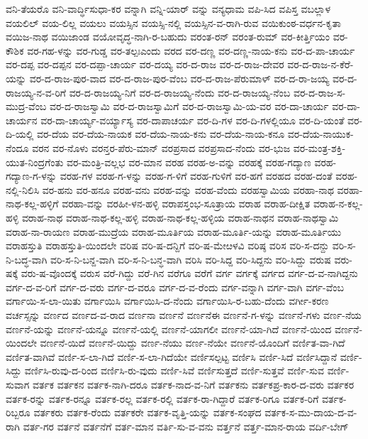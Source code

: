 ವನಿ-ತೆಯರೊ
ವನಿ-ವಾರ್ದ್ಧಿಸುಧಾ-ಕರ
ವನ್ನಾಗಿ
ವನ್ನಿ-ಯಾರ್
ವನ್ನು
ವನ್ಯಧಾಮ
ವಪಿ-ಸಿದ
ವಪಿಸ್ತ
ವಬಲ್ಲಾಳ
ವಯಲಿಲ್
ವಯ-ಲಿಲ್ಲ
ವಯಲು
ವಯಸ್ಸಿನ
ವಯಸ್ಸಿ-ನಲ್ಲಿ
ವಯಸ್ಸಿನ-ವ-ರಾಗಿ-ರುವ
ವಯಿಕುಂಠ-ವರ್ಧನ-ಕೃತಾ
ವಯಿಜ-ನಾಥ
ವಯಿಜಾಂಡ
ವಯೋವೃದ್ಧ-ನಾಗಿ-ರ-ಬಹುದು
ವರಂತ-ರನ್
ವರಂತ-ರುಮ್
ವರ-ಕೀರ್ತ್ತಿಯಂ
ವರ-ಕೌಶಿಕ
ವರ-ಗಹ-ಳನ್ನು
ವರ-ಗುಡ್ಡ
ವರ-ತಲ್ಪಃಎಂದು
ವರದ
ವರ-ದಣ್ಣ
ವರ-ದಣ್ಣ-ನಾಯ-ಕನು
ವರ-ದ-ಪಾ-ಚಾರ್ಯ
ವರ-ದಪ್ಪ
ವರ-ದಪ್ಪನ
ವರ-ದಪ್ಪಾ-ಚಾರ್ಯ
ವರ-ದಯ್ಯ
ವರ-ದ-ರಾಜ
ವರ-ದ-ರಾಜ-ದೇವರ
ವರ-ದ-ರಾಜ-ನ-ಕೆರೆ-ಯನ್ನು
ವರ-ದ-ರಾಜ-ಪುರ-ವಾದ
ವರ-ದ-ರಾಜ-ಪುರ-ವೆಂಬ
ವರ-ದ-ರಾಜ-ಪೆರುಮಾಳ್
ವರ-ದ-ರಾ-ಜಯ್ಯ
ವರ-ದ-ರಾಜಯ್ಯ-ನ-ವ-ರಿಗೆ
ವರ-ದ-ರಾಜಯ್ಯ-ನಿಗೆ
ವರ-ದ-ರಾಜಯ್ಯ-ನೆಂದು
ವರ-ದ-ರಾಜಯ್ಯ-ನೆಂಬ
ವರ-ದ-ರಾಜ-ಸ-ಮುದ್ರ-ವೆಂಬ
ವರ-ದ-ರಾಜಸ್ವಾಮಿ
ವರ-ದ-ರಾಜಸ್ವಾಮಿಗೆ
ವರ-ದ-ರಾಜಸ್ವಾಮಿ-ಯ-ವರ
ವರ-ದಾ-ಚಾರ್ಯ
ವರ-ದಾ-ಚಾರ್ಯನ
ವರ-ದಾ-ಚಾರ್ಯ್ಯ-ವರ್ಯ್ಯಾಸ್ಯ
ವರ-ದಾಪಾಚರ್ಯ
ವರ-ದಿ-ಗಳ
ವರ-ದಿ-ಗಳಲ್ಲಿಯೂ
ವರ-ದಿ-ಯಂತೆ
ವರ-ದಿ-ಯಲ್ಲಿ
ವರ-ದೆಯ
ವರ-ದೆಯ-ನಾಯಕ
ವರ-ದೆಯ-ನಾಯ-ಕನು
ವರ-ದೆಯ-ನಾಯ-ಕನೂ
ವರ-ದೆಯ-ನಾಯುಕ-ನೆಂದೂ
ವರನ
ವರ-ನೊಳು
ವರನ್ತರ-ಪೆರು-ಮಾನ್
ವರಪ್ರಸಾದ
ವರಪ್ರಸಾದ-ನೆಂದು
ವರ-ಭುಜ
ವರ-ಮಂತ್ರ-ಶಕ್ತಿ-ಯುತ-ನಿಂದ್ರಗೆಂತು
ವರ-ಮಂತ್ರಿ-ವಲ್ಲಭ
ವರ-ಮಾನ
ವರಹ
ವರಹ-ಅ-ವನ್ನು
ವರಹಕ್ಕೆ
ವರಹ-ಗದ್ಯಾಣ
ವರಹ-ಗದ್ಯಾಣ-ಗ-ಳನ್ನು
ವರಹ-ಗಳ
ವರಹ-ಗ-ಳನ್ನು
ವರಹ-ಗ-ಳಿಗೆ
ವರಹ-ಗುಳಿಗೆ
ವರ-ಹಗೆ
ವರಹದ
ವರಹ-ದಂತೆ
ವರಹ-ನಲ್ಲಿ-ನಿಲಿಸಿ
ವರ-ಹನು
ವರ-ಹನೂ
ವರಹ-ವನು
ವರಹ-ವನ್ನು
ವರಹ-ವೆಂದು
ವರಹಸ್ವಾಮಿಯ
ವರಹಾ-ನಾಥ
ವರಹಾ-ನಾಥ-ಕಲ್ಲ-ಹಳ್ಳಿಗೆ
ವರಹಾ-ವನ್ನು
ವರಹೀ-ಳನ-ಹಳ್ಳಿ
ವರಾಪಸ್ತಂಭ-ಸೂತ್ರಾಯ
ವರಾಹ
ವರಾಹ-ದೀಕ್ಷಿತ
ವರಾಹ-ನ-ಕಲ್ಲ-ಹಳ್ಳಿ
ವರಾಹ-ನಾಥ
ವರಾಹ-ನಾಥ-ಕಲ್ಲ-ಹಳ್ಳಿ
ವರಾಹ-ನಾಥ-ಕಲ್ಲ-ಹಳ್ಳಿಯ
ವರಾಹ-ನಾಥನ
ವರಾಹ-ನಾಥಸ್ವಾಮಿ
ವರಾಹ-ನಾ-ರಾಯಣ
ವರಾಹ-ಮುದ್ರೆಯ
ವರಾಹ-ಮೂರ್ತಿಯ
ವರಾಹ-ಮೂರ್ತಿ-ಯನ್ನು
ವರಾಹ-ಮೂರ್ತಿಯು
ವರಾಹಸ್ತುತಿ
ವರಾಹಸ್ತುತಿ-ಯಿಂದಲೇ
ವರಿಷ
ವರಿ-ಷ-ದನ್ದಿಗೆ
ವರಿ-ಷ-ಮೇೞಳವಿ
ವರಿಷ್ಠ
ವರಿಸ
ವರಿ-ಸ-ದನ್ದು
ವರಿ-ಸ-ನಿ-ಬದ್ಧ-ವಾಗಿ
ವರಿ-ಸ-ನಿ-ಬನ್ದ-ವಾಗಿ
ವರಿ-ಸ-ನಿ-ಬನ್ಧ-ವಾಗಿ
ವರಿಸಿ
ವರಿ-ಸಿದ್ದ
ವರಿ-ಸಿದ್ದನು
ವರಿ-ಸಿದ್ದು
ವರುಷ
ವರು-ಷಕ್ಕೆ
ವರು-ಷ-ವೊಂದಕ್ಕೆ
ವರುಸ
ವರೆ-ಗಿದ್ದು
ವರೆ-ಗಿನ
ವರೆಗೂ
ವರೆಗೆ
ವರ್ಗ
ವರ್ಗಕ್ಕೆ
ವರ್ಗದ
ವರ್ಗ-ದ-ವ-ನಾಗಿದ್ದನು
ವರ್ಗ-ದ-ವ-ರಿಗೆ
ವರ್ಗ-ದ-ವರು
ವರ್ಗ-ದ-ವರೂ
ವರ್ಗ-ದ-ವ-ರೆಂದು
ವರ್ಗ-ವನ್ನಾಗಿ
ವರ್ಗ-ವಾಗಿ
ವರ್ಗ-ವೆಂಬ
ವರ್ಗಾಯಿ-ಸ-ಲಾ-ಯಿತು
ವರ್ಗಾಯಿಸಿ
ವರ್ಗಾಯಿಸಿ-ದ-ನೆಂದು
ವರ್ಗಾಯಿಸಿ-ರ-ಬಹು-ದೆಂದು
ವರ್ಗೀ-ಕರಣ
ವರ್ಚಸ್ಸನ್ನು
ವರ್ಣದ
ವರ್ಣದ-ವ-ರಾದ
ವರ್ಣನಾ
ವರ್ಣನೆ
ವರ್ಣನೆಈ
ವರ್ಣನೆ-ಗ-ಳನ್ನು
ವರ್ಣನೆ-ಗಳು
ವರ್ಣ-ನೆಯ
ವರ್ಣನೆ-ಯನ್ನು
ವರ್ಣನೆ-ಯನ್ನೂ
ವರ್ಣನೆ-ಯಲ್ಲಿ
ವರ್ಣನೆ-ಯಾಗಲೀ
ವರ್ಣನೆ-ಯಾ-ಗಿದೆ
ವರ್ಣನೆ-ಯಿಂದ
ವರ್ಣನೆ-ಯಿಂದಲೇ
ವರ್ಣನೆ-ಯಿದೆ
ವರ್ಣನೆ-ಯಿದ್ದು
ವರ್ಣ-ನೆಯು
ವರ್ಣ-ನೆಯೇ
ವರ್ಣನೆ-ಯೊಂದಿಗೆ
ವರ್ಣಿತ-ವಾ-ಗಿದೆ
ವರ್ಣಿತ-ವಾಗಿವೆ
ವರ್ಣಿ-ಸ-ಲಾ-ಗಿದೆ
ವರ್ಣಿ-ಸ-ಲಾ-ಗಿದೆಯೇ
ವರ್ಣಿಸಲ್ಪಟ್ಟ
ವರ್ಣಿಸಿ
ವರ್ಣಿ-ಸಿದೆ
ವರ್ಣಿಸಿದ್ದಾನೆ
ವರ್ಣಿ-ಸಿದ್ದು
ವರ್ಣಿಸಿ-ರುವು-ದ-ರಿಂದ
ವರ್ಣಿಸಿ-ರು-ವುದು
ವರ್ಣಿ-ಸಿವೆ
ವರ್ಣಿಸುತ್ತದೆ
ವರ್ಣಿ-ಸುತ್ತವೆ
ವರ್ಣಿ-ಸುವ
ವರ್ಣಿ-ಸುವಾಗ
ವರ್ತಕ
ವರ್ತಕನ
ವರ್ತಕ-ನಾಗಿ-ದರೂ
ವರ್ತಕ-ನಾದ-ವ-ನಿಗೆ
ವರ್ತಕನು
ವರ್ತಕಪ್ರ-ಕಾರ-ದ-ವರು
ವರ್ತಕರ
ವರ್ತಕ-ರನ್ನು
ವರ್ತಕ-ರನ್ನೂ
ವರ್ತಕ-ರಲ್ಲ
ವರ್ತಕ-ರಲ್ಲಿ
ವರ್ತಕ-ರಾ-ಗಿದ್ದಾರೆ
ವರ್ತಕ-ರಿಗೂ
ವರ್ತಕ-ರಿಗೆ
ವರ್ತಕ-ರಿಬ್ಬರೂ
ವರ್ತಕರು
ವರ್ತಕ-ರೆಂದು
ವರ್ತಕರೇ
ವರ್ತಕ-ವೃತ್ತಿ-ಯನ್ನು
ವರ್ತಕ-ಸಂಘದ
ವರ್ತಕ-ಸ-ಮು-ದಾಯ-ದ-ವ-ರಾಗಿ
ವರ್ತ-ಗರ
ವರ್ತನೆ
ವರ್ತನೆಗೆ
ವರ್ತ-ಮಾನ
ವರ್ತಿ-ಸು-ವ-ವನು
ವರ್ತ್ತನೆ
ವರ್ತ್ತ-ಮಾನ-ರಾಯ
ವರ್ದಿ-ಬೇಗ್
